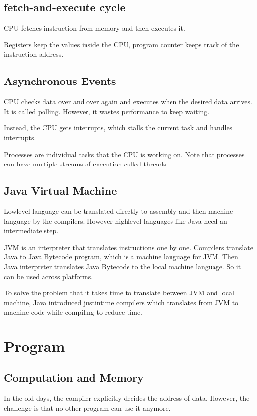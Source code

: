 \documentclass[letterpaper,12pt]{article}
\begin{document}
\subsection{fetch-and-execute cycle}
CPU fetches instruction from memory and then executes it.

Registers keep the values inside the CPU, program counter keeps track of the instruction address.

\subsection{Asynchronous Events}
CPU checks data over and over again and executes when the desired data arrives. It is called polling. However, it wastes performance to keep waiting.

Instead, the CPU gets interrupts, which stalls the current task and handles interrupts.

Processes are individual tasks that the CPU is working on. Note that processes can have multiple streams of execution called threads.

\subsection{Java Virtual Machine}
Low\-level language can be translated directly to assembly and then machine language by the compilers. However high\-level languages like Java need an intermediate step.

JVM is an interpreter that translates instructions one by one. Compilers translate Java to Java Bytecode program, which is a machine language for JVM. Then Java interpreter translates Java Bytecode to the local machine language. So it can be used across platforms.

To solve the problem that it takes time to translate between JVM and local machine, Java introduced just\-in\-time compilers which translates from JVM to machine code while compiling to reduce time.
\section{Program}

\subsection{Computation and Memory}

In the old days, the compiler explicitly decides the address of data. However, the challenge is that no other program can use it anymore.
\end{document}
